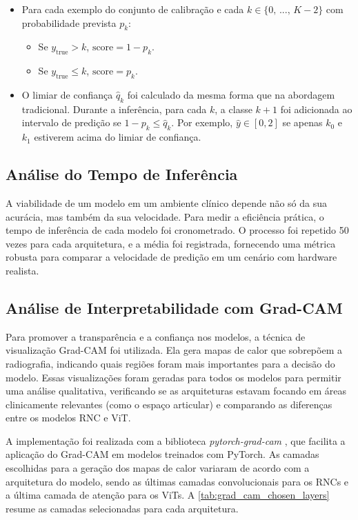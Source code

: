 \begin{itemize}
    \item Para cada exemplo do conjunto de calibração e cada $k \in \lbrace 0 \text{, } ... \text{, } K-2 \rbrace$ com probabilidade prevista $p_k$:
        \begin{itemize}
            \item Se $y_{\text{true}} > k$, $\text{score} = 1 - p_k$.
            \item Se $y_{\text{true}} \leq k$, $\text{score} = p_k$.
        \end{itemize}
    \item O limiar de confiança $\hat{q}_k$ foi calculado da mesma forma que na abordagem tradicional. Durante a inferência, para cada $k$, a classe $k+1$ foi adicionada ao intervalo de predição se $1 - p_k \leq \hat{q}_k$. Por exemplo, $\hat{y} \in [0,2]$ se apenas $k_0$ e $k_1$ estiverem acima do limiar de confiança.
\end{itemize}

\subsection{Análise do Tempo de Inferência}

A viabilidade de um modelo em um ambiente clínico depende não só da sua acurácia, mas também da sua velocidade. Para medir a eficiência prática, o tempo de inferência de cada modelo foi cronometrado. O processo foi repetido 50 vezes para cada arquitetura, e a média foi registrada, fornecendo uma métrica robusta para comparar a velocidade de predição em um cenário com hardware realista.

\subsection{Análise de Interpretabilidade com Grad-CAM}

Para promover a transparência e a confiança nos modelos, a técnica de visualização Grad-CAM foi utilizada. Ela gera mapas de calor que sobrepõem a radiografia, indicando quais regiões foram mais importantes para a decisão do modelo. Essas visualizações foram geradas para todos os modelos para permitir uma análise qualitativa, verificando se as arquiteturas estavam focando em áreas clinicamente relevantes (como o espaço articular) e comparando as diferenças entre os modelos RNC e ViT.

A implementação foi realizada com a biblioteca \textit{pytorch-grad-cam} \cite{jacobgilpytorchcam}, que facilita a aplicação do Grad-CAM em modelos treinados com PyTorch. As camadas escolhidas para a geração dos mapas de calor variaram de acordo com a arquitetura do modelo, sendo as últimas camadas convolucionais para os RNCs e a última camada de atenção para os ViTs. A \autoref{tab:grad_cam_chosen_layers} resume as camadas selecionadas para cada arquitetura.

